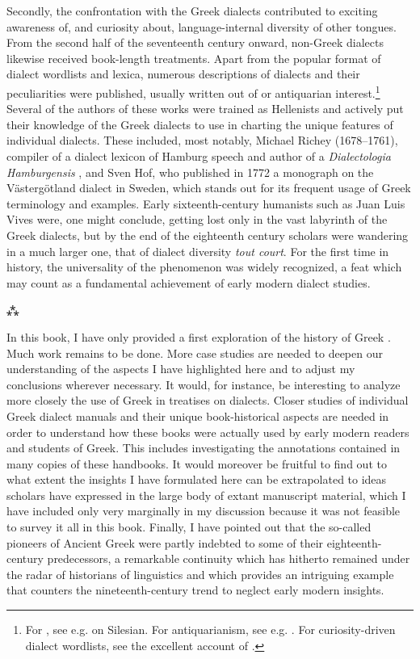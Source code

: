 Secondly, the confrontation with the Greek dialects contributed to exciting awareness of, and curiosity about, language-internal diversity of other tongues. From the second half of the seventeenth century onward, non-Greek dialects likewise received book-length treatments. Apart from the popular format of dialect wordlists and lexica, numerous descriptions of  dialects and their peculiarities were published, usually written out of  or antiquarian interest.\footnote{For , see e.g. \citet{Meisner1705} on Silesian. For antiquarianism, see e.g. \citet{Oberlin1775}. For curiosity-driven dialect wordlists, see the excellent account of \citet{Considine2017}.} Several of the authors of these works were trained as Hellenists and actively put their knowledge of the Greek dialects to use in charting the unique features of individual dialects. These included, most notably, Michael Richey (1678–1761), compiler of a dialect lexicon of Hamburg speech \citep{Richey1743} and author of a \textit{Dialectologia Hamburgensis} \citep{Richey1755}, and Sven Hof, who published in 1772 a monograph on the Västergötland dialect in Sweden, which stands out for its frequent usage of Greek terminology and examples. Early sixteenth-century humanists such as Juan Luis Vives were, one might conclude, getting lost only in the vast labyrinth of the Greek dialects, but by the end of the eighteenth century scholars were wandering in a much larger one, that of dialect diversity \textit{tout court}. For the first time in history, the universality of the phenomenon was widely recognized, a feat which may count as a fundamental achievement of early modern dialect studies.

\begin{center}
\large⁂
\end{center}

\noindent In this book, I have only provided a first exploration of the history of Greek . Much work remains to be done. More case studies are needed to deepen our understanding of the aspects I have highlighted here and to adjust my conclusions wherever necessary. It would, for instance, be interesting to analyze more closely the use of Greek in treatises on  dialects. Closer studies of individual Greek dialect manuals and their unique book-historical aspects are needed in order to understand how these books were actually used by early modern readers and students of Greek. This includes investigating the annotations contained in many copies of these handbooks. It would moreover be fruitful to find out to what extent the insights I have formulated here can be extrapolated to ideas scholars have expressed in the large body of extant manuscript material, which I have included only very marginally in my discussion because it was not feasible to survey it all in this book. Finally, I have pointed out that the so-called pioneers of Ancient Greek  were partly indebted to some of their eighteenth-century predecessors, a remarkable continuity which has hitherto remained under the radar of historians of linguistics and which provides an intriguing example that counters the nineteenth-century trend to neglect early modern insights.


